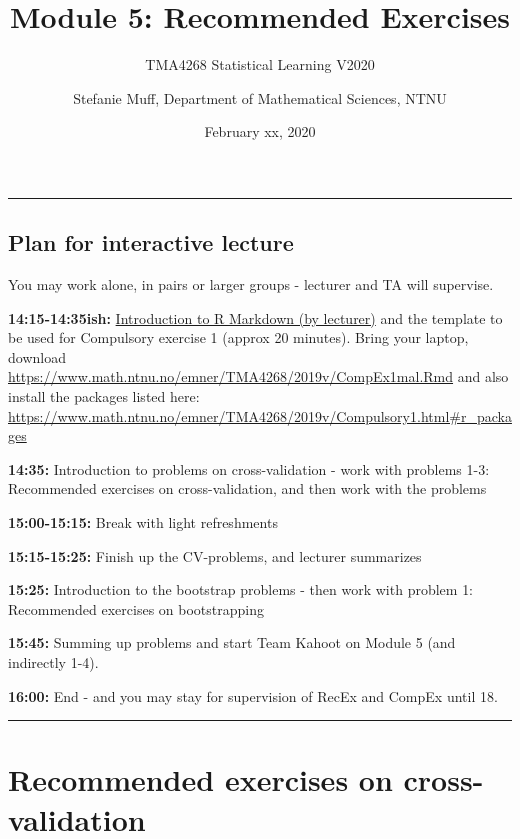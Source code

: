 \documentclass[]{article}
\title{Module 5: Recommended Exercises}
\subtitle{TMA4268 Statistical Learning V2020}
\author{Stefanie Muff, Department of Mathematical Sciences, NTNU}
\date{February xx, 2020}
\begin{document}
\maketitle

{
\hypersetup{linkcolor=black}
\setcounter{tocdepth}{2}
\tableofcontents
}
\begin{center}\rule{0.5\linewidth}{\linethickness}\end{center}

\subsection{Plan for interactive
lecture}\label{plan-for-interactive-lecture}

You may work alone, in pairs or larger groups - lecturer and TA will
supervise.

\textbf{14:15-14:35ish:}
\href{https://www.math.ntnu.no/emner/TMA4268/2019v/RMarkdownIntro.html}{Introduction
to R Markdown (by lecturer)} and the template to be used for Compulsory
exercise 1 (approx 20 minutes). Bring your laptop, download
\url{https://www.math.ntnu.no/emner/TMA4268/2019v/CompEx1mal.Rmd} and
also install the packages listed here:
\url{https://www.math.ntnu.no/emner/TMA4268/2019v/Compulsory1.html\#r_packages}

\textbf{14:35:} Introduction to problems on cross-validation - work with
problems 1-3: Recommended exercises on cross-validation, and then work
with the problems

\textbf{15:00-15:15:} Break with light refreshments

\textbf{15:15-15:25:} Finish up the CV-problems, and lecturer summarizes

\textbf{15:25:} Introduction to the bootstrap problems - then work with
problem 1: Recommended exercises on bootstrapping

\textbf{15:45:} Summing up problems and start Team Kahoot on Module 5
(and indirectly 1-4).

\textbf{16:00:} End - and you may stay for supervision of RecEx and
CompEx until 18.

\begin{center}\rule{0.5\linewidth}{\linethickness}\end{center}

\section{Recommended exercises on
cross-validation}\label{recommended-exercises-on-cross-validation}
\end{document}
